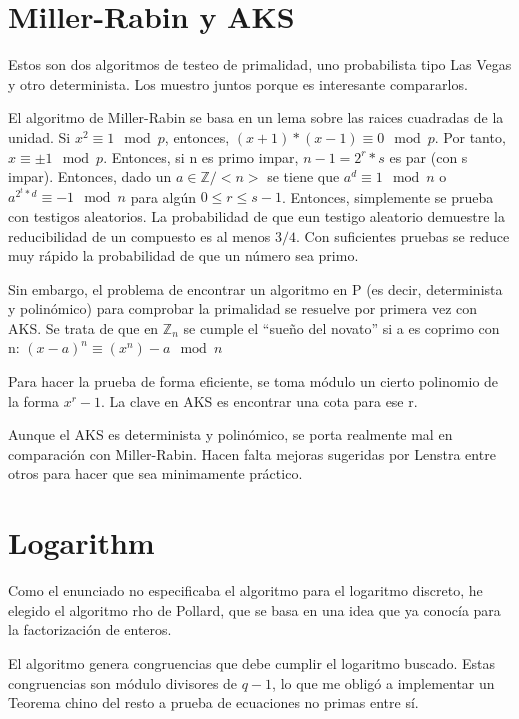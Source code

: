 \documentclass[12pt, a5paper]{article}
\theoremstyle{definition}
\begin{document}
\section{Miller-Rabin y AKS}
  Estos son dos algoritmos de testeo de primalidad, uno probabilista
  tipo Las Vegas y otro determinista. Los muestro juntos porque es
  interesante compararlos.

  El algoritmo de Miller-Rabin se basa en un lema sobre las raices
  cuadradas de la unidad. Si $x^2\equiv 1 \mod p$, entonces,
  $(x+1)*(x-1)\equiv 0 \mod p$. Por tanto, $x\equiv \pm 1 \mod p$.
  Entonces, si n es primo impar, $n-1=2^r*s$ es par (con s impar).
  Entonces, dado un $a\in \mathbb{Z}/<n>$ se tiene que $a^d\equiv 1
  \mod n$ o $a^{2^t*d}\equiv -1 \mod n$ para algún $0\leq r\leq s-1$.
  Entonces, simplemente se prueba con testigos aleatorios. La
  probabilidad de que eun testigo aleatorio demuestre la reducibilidad
  de un compuesto es al menos $3/4$. Con suficientes pruebas se reduce
  muy rápido la probabilidad de que un número sea primo.

  Sin embargo, el problema de encontrar un algoritmo en P (es decir,
  determinista y polinómico) para comprobar la primalidad se resuelve
  por primera vez con AKS. Se trata de que en $\mathbb{Z}_n$ se cumple
  el ``sueño del novato'' si a es coprimo con n: $(x-a)^n\equiv(x^n)-a \mod n$ 

  Para hacer la prueba de forma eficiente, se toma módulo un cierto
  polinomio de la forma $x^r-1$. La clave en AKS es encontrar una cota
  para ese r.

  Aunque el AKS es determinista y polinómico, se porta realmente mal
  en comparación con Miller-Rabin. Hacen falta mejoras sugeridas por
  Lenstra entre otros para hacer que sea minimamente práctico.

\newpage
\newpage

\section{Logarithm}
  Como el enunciado no especificaba el algoritmo para el logaritmo
  discreto, he elegido el algoritmo rho de Pollard, que se basa en una
  idea que ya conocía para la factorización de enteros.

  El algoritmo genera congruencias que debe cumplir el logaritmo
  buscado. Estas congruencias son módulo divisores de $q-1$, lo que
  me obligó a implementar un Teorema chino del resto a prueba de
  ecuaciones no primas entre sí.
\end{document}
